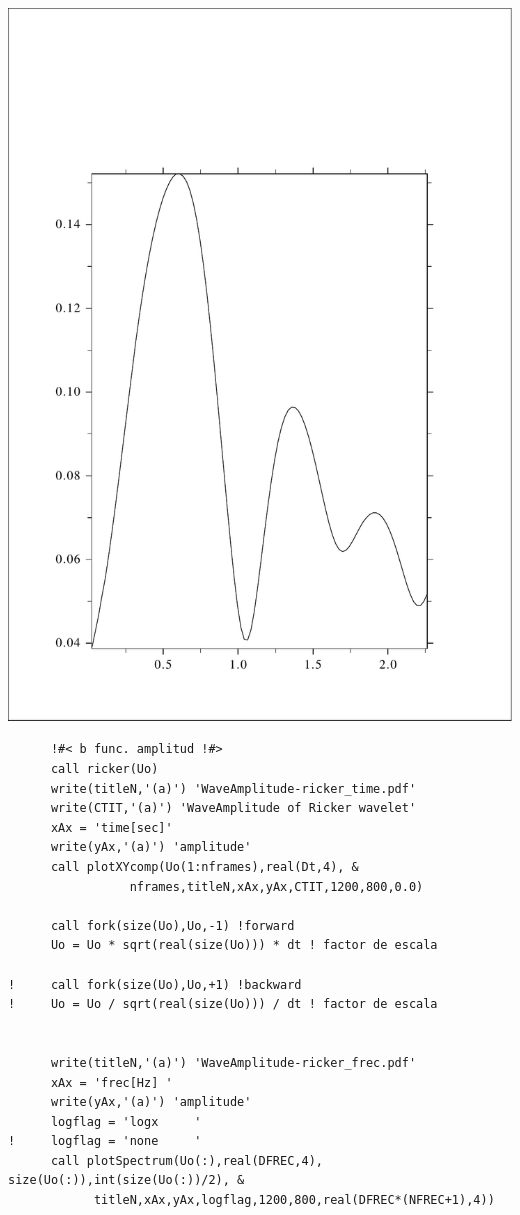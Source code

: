 \documentclass [11pt,spanish]{article}
\begin{document}
\includegraphics[scale=0.4]{RES_2s_tt2abspi.pdf}
\begingroup
\fontsize{10pt}{12pt}
\selectfont
{}
\begin{shaded}
\begin{verbatim}
      !#< b func. amplitud !#>
      call ricker(Uo)
      write(titleN,'(a)') 'WaveAmplitude-ricker_time.pdf'
      write(CTIT,'(a)') 'WaveAmplitude of Ricker wavelet'
      xAx = 'time[sec]'
      write(yAx,'(a)') 'amplitude'
      call plotXYcomp(Uo(1:nframes),real(Dt,4), & 
                 nframes,titleN,xAx,yAx,CTIT,1200,800,0.0)
      
      call fork(size(Uo),Uo,-1) !forward
      Uo = Uo * sqrt(real(size(Uo))) * dt ! factor de escala
      
!     call fork(size(Uo),Uo,+1) !backward
!     Uo = Uo / sqrt(real(size(Uo))) / dt ! factor de escala
      
      
      write(titleN,'(a)') 'WaveAmplitude-ricker_frec.pdf'
      xAx = 'frec[Hz] '
      write(yAx,'(a)') 'amplitude'      
      logflag = 'logx     '      
!     logflag = 'none     '
      call plotSpectrum(Uo(:),real(DFREC,4), size(Uo(:)),int(size(Uo(:))/2), & 
            titleN,xAx,yAx,logflag,1200,800,real(DFREC*(NFREC+1),4))

\end{verbatim}
\end{shaded}
\endgroup
\end{document}
